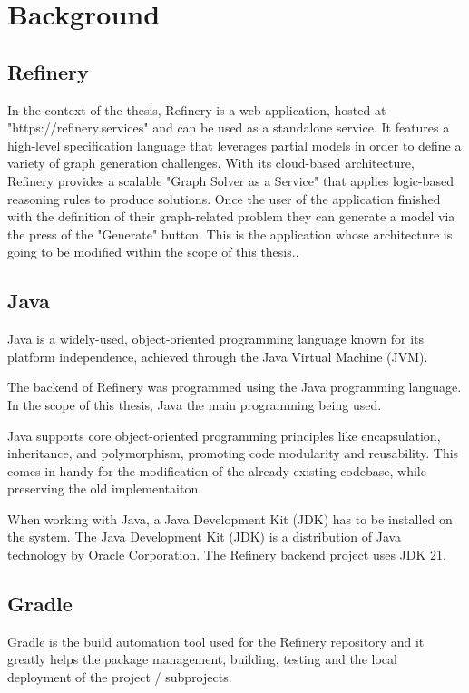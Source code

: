 \chapter{Background} \label{Background}
\section{Refinery}
	In the context of the thesis, Refinery \cite{refinery} is a web application, hosted at "https://refinery.services" and can be used as a standalone service.
	It features a high-level specification language that leverages partial models in order to define a variety of graph generation challenges. 
	With its cloud-based architecture, Refinery provides a scalable "Graph Solver as a Service" that applies logic-based reasoning rules to 
	produce solutions. Once the user of the application finished with the definition of 
	their graph-related problem they can generate a model via the press of the "Generate" button. 	
	This is the application whose architecture is going to be modified within the scope of this thesis..


\section{Java}
	Java \cite{java} is a widely-used, object-oriented programming language known for its platform independence, achieved through the Java Virtual Machine (JVM). 

	The backend of Refinery was programmed using the Java programming language. In the scope of this thesis, Java the main programming being used.

	Java supports core object-oriented programming principles like encapsulation, inheritance, and polymorphism, promoting code modularity and reusability.
	This comes in handy for the modification of the already existing codebase, while preserving the old implementaiton.

	When working with Java, a Java Development Kit (JDK) has to be installed on the system.
	The Java Development Kit (JDK) is a distribution of Java technology by Oracle Corporation. 
	The Refinery backend project uses JDK 21.

\section{Gradle}
	Gradle \cite{gradle} is the build automation tool used for the Refinery repository and it greatly helps the package management, 
	building, testing and the local deployment of the project / subprojects.

